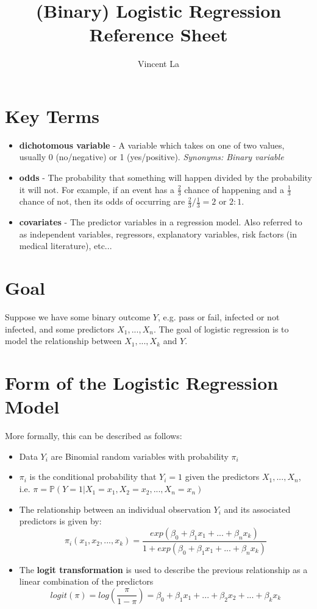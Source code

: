 \documentclass[]{article}
\title{(Binary) Logistic Regression Reference Sheet}
\author{Vincent La}
\begin{document}
\maketitle

\section{Key Terms}
\begin{itemize}
	\item \textbf{dichotomous variable} - A variable which takes on one of two values, usually 0 (no/negative) or 1 (yes/positive). \textit{Synonyms: Binary variable}
	\item \textbf{odds} - The probability that something will happen divided by the probability it will not. For example, if an event has a $\frac{2}{3}$ chance of happening and a $\frac{1}{3}$ chance of not, then its odds of occurring are $\frac{2}{3}/\frac{1}{3} = 2$ or $2:1$.
	\item \textbf{covariates} - The predictor variables in a regression model. Also referred to as independent variables, regressors, explanatory variables, risk factors (in medical literature), etc...
\end{itemize}

\section{Goal}
Suppose we have some binary outcome $Y$, e.g. pass or fail, infected or not infected, and some predictors $X_1, ..., X_n$. The goal of logistic regression is to model the relationship between $X_1, ..., X_k$ and $Y$.

\section{Form of the Logistic Regression Model}
More formally, this can be described as follows:
\begin{itemize}
	\item Data $Y_i$ are Binomial random variables with probability $\pi_i$
	\item $\pi_i$ is the conditional probability that $Y_i = 1$ given the predictors $X_1, ..., X_n$, i.e. $\pi = \mathbb{P}(Y = 1 | X_1 = x_1, X_2 = x_2, ..., X_n = x_n)$
	\item The relationship between an individual observation $Y_i$ and its associated predictors is given by:
		\[\pi_i(x_1, x_2, ..., x_k) = \frac{exp(\beta_0 + \beta_1x_1 + ... + \beta_{n}x_k)}{1 + exp(\beta_0 + \beta_1x_1 + ... + \beta_nx_k)} \]
	\item The \textbf{logit transformation} is used to describe the previous relationship as a linear combination of the predictors
		\[
		logit(\pi) = log(\frac{\pi}{1-\pi}) = \beta_0 + \beta_1x_1 + ... + \beta_2x_2 + ... + \beta_kx_k
		\]
\end{itemize}
\end{document}
